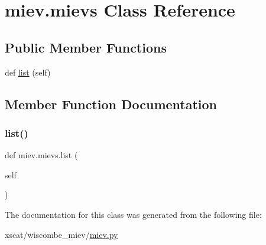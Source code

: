 \hypertarget{classmiev_1_1mievs}{}\section{miev.\+mievs Class Reference}
\label{classmiev_1_1mievs}
\subsection*{Public Member Functions}
\begin{DoxyCompactItemize}
\item 
def \hyperlink{classmiev_1_1mievs_ae4c817a3c056f20ca474363543ff2943}{list} (self)
\end{DoxyCompactItemize}


\subsection{Member Function Documentation}
\mbox{\label{classmiev_1_1mievs_ae4c817a3c056f20ca474363543ff2943}} 
\subsubsection{\texorpdfstring{list()}{list()}}
{\footnotesize\ttfamily def miev.\+mievs.\+list (\begin{DoxyParamCaption}\item[{}]{self }\end{DoxyParamCaption})}



The documentation for this class was generated from the following file\+:\begin{DoxyCompactItemize}
\item 
xscat/wiscombe\+\_\+miev/\hyperlink{miev_8py}{miev.\+py}\end{DoxyCompactItemize}
